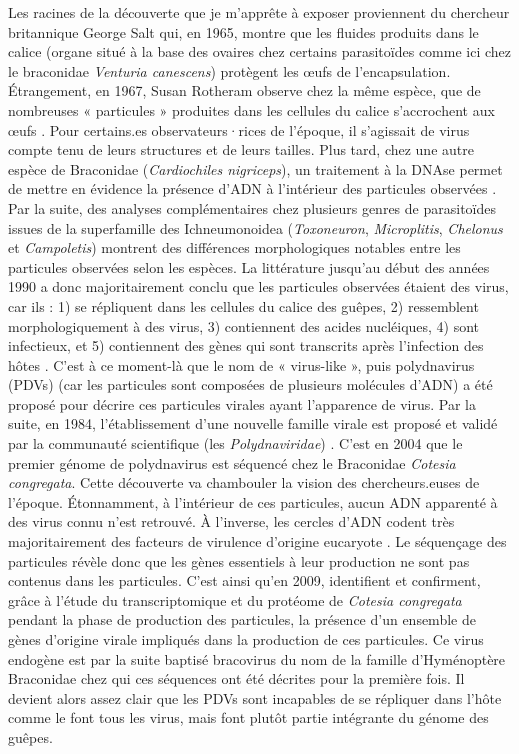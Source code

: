 Les racines de la découverte que je m'apprête à exposer proviennent du chercheur britannique George Salt qui, en 1965, montre que les fluides produits dans le calice (organe situé à la base des ovaires chez certains parasitoïdes comme ici chez le braconidae \textit{Venturia canescens}) protègent les œufs de l’encapsulation. Étrangement, en 1967, Susan Rotheram observe chez la même espèce, que de nombreuses « particules » produites dans les cellules du calice s'accrochent aux œufs \citep{rotheram_immune_1967,noauthor_surface_1973}. Pour certains.es observateurs·rices de l’époque, il s'agissait de virus compte tenu de leurs structures et de leurs tailles. Plus tard, chez une autre espèce de Braconidae (\textit{Cardiochiles nigriceps}), un traitement à la DNAse permet de mettre en évidence la présence d'ADN à l'intérieur des particules observées \citep{vinson_particles_1975}. Par la suite, des analyses complémentaires chez plusieurs genres de parasitoïdes issues de la superfamille des Ichneumonoidea (\textit{Toxoneuron}, \textit{Microplitis}, \textit{Chelonus} et \textit{Campoletis}) montrent des différences morphologiques notables entre les particules observées selon les espèces. La littérature jusqu'au début des années 1990 a donc majoritairement conclu que les particules observées étaient des virus, car ils : 1) se répliquent dans les cellules du calice des guêpes, 2) ressemblent morphologiquement à des virus, 3) contiennent des acides nucléiques, 4) sont infectieux, et 5) contiennent des gènes qui sont transcrits après l'infection des hôtes \citep{fleming_polydnaviruses_1992,stoltz_viruses_1979}. C’est à ce moment-là que le nom de « virus-like », puis polydnavirus (PDVs) (car les particules sont composées de plusieurs molécules d'ADN) a été proposé pour décrire ces particules virales ayant l'apparence de virus. Par la suite, en 1984, l'établissement d’une nouvelle famille virale est proposé et validé par la communauté scientifique (les \textit{Polydnaviridae}) \citep{stoltz_polydnaviridae_1984}. C’est en 2004 que le premier génome de polydnavirus est séquencé chez le Braconidae \textit{Cotesia congregata}. Cette découverte va chambouler la vision des chercheurs.euses de l’époque. Étonnamment, à l’intérieur de ces particules, aucun ADN apparenté à des virus connu n'est retrouvé. À l'inverse, les cercles d'ADN codent très majoritairement des facteurs de virulence d'origine eucaryote \citep{espagne_genome_2004,desjardins_comparative_2008}. Le séquençage des particules révèle donc que les gènes essentiels à leur production ne sont pas contenus dans les particules. C’est ainsi qu’en 2009, \cite{bezier_polydnaviruses_2009} identifient et confirment, grâce à l'étude du transcriptomique et du protéome de \textit{Cotesia congregata} pendant la phase de production des particules, la présence d'un ensemble de gènes d'origine virale impliqués dans la production de ces particules. Ce virus endogène est par la suite baptisé bracovirus du nom de la famille d’Hyménoptère Braconidae chez qui ces séquences ont été décrites pour la première fois. 
Il devient alors assez clair que les PDVs sont incapables de se répliquer dans l'hôte comme le font tous les virus, mais font plutôt partie intégrante du génome des guêpes.\\


